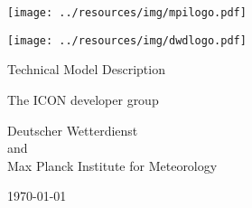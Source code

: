 \documentclass[DIV16,BCOR1cm,11pt,a4paper,twoside]{scrbook}
\begin{document}
\pagestyle{empty}

\renewcommand{\footnoterule}{\rule{0pt}{0pt}\vspace{0pt}}

\begin{center}
\ifpdf
\parbox{2cm}{
\texttt{[image: ../resources/img/mpilogo.pdf]}
}
\hfill
\parbox{2cm}{
\texttt{[image: ../resources/img/dwdlogo.pdf]}
}
\fi
\end{center}

\vspace{2cm}

\begin{center}
{\sectfont\Huge
\color{mpggreen}Technical Model Description\color{black}\\[0.5ex]
}
\end{center}

\vspace{2cm}

\begin{center}
{\sectfont\Large
The ICON developer group}
\end{center}

\vspace{1cm}

\begin{center}
{\sectfont\Large
Deutscher Wetterdienst\\and\\
Max Planck Institute for Meteorology\\

\vspace{1cm}

\today}
\end{center}
\cleardoublepage

\tableofcontents

\cleardoublepage
\pagestyle{plain}

%






%



%

%

%

%
\end{document}
